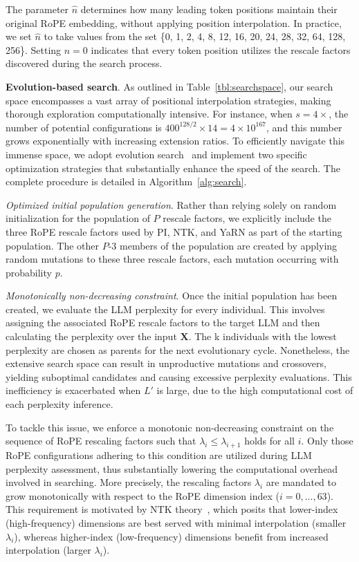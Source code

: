 The parameter $\hat{n}$ determines how many leading token positions maintain their original RoPE embedding, without applying position interpolation. In practice, we set $\hat{n}$ to take values from the set \{0, 1, 2, 4, 8, 12, 16, 20, 24, 28, 32, 64, 128, 256\}. Setting $\hat{n}=0$ indicates that every token position utilizes the rescale factors discovered during the search process.

\textbf{Evolution-based search}. As outlined in Table~\ref{tbl:searchspace}, our search space encompasses a vast array of positional interpolation strategies, making thorough exploration computationally intensive. For instance, when $s=4\times$, the number of potential configurations is $400^{128/2}\times14 = 4\times10^{167}$, and this number grows exponentially with increasing extension ratios. To efficiently navigate this immense space, we adopt evolution search~\cite{guo2020single} and implement two specific optimization strategies that substantially enhance the speed of the search. The complete procedure is detailed in Algorithm~\ref{alg:search}.

\textit{Optimized initial population generation}. Rather than relying solely on random initialization for the population of $P$ rescale factors, we explicitly include the three RoPE rescale factors used by PI, NTK, and YaRN as part of the starting population. The other $P$-3 members of the population are created by applying random mutations to these three rescale factors, each mutation occurring with probability $p$.

\textit{Monotonically non-decreasing constraint}. Once the initial population has been created, we evaluate the LLM perplexity for every individual. This involves assigning the associated RoPE rescale factors to the target LLM and then calculating the perplexity over the input $\mathbf{X}$. The k individuals with the lowest perplexity are chosen as parents for the next evolutionary cycle. Nonetheless, the extensive search space can result in unproductive mutations and crossovers, yielding suboptimal candidates and causing excessive perplexity evaluations. This inefficiency is exacerbated when $L'$ is large, due to the high computational cost of each perplexity inference.

To tackle this issue, we enforce a monotonic non-decreasing constraint on the sequence of RoPE rescaling factors such that $\lambda_i \le \lambda_{i+1}$ holds for all $i$. Only those RoPE configurations adhering to this condition are utilized during LLM perplexity assessment, thus substantially lowering the computational overhead involved in searching. More precisely, the rescaling factors $\lambda_i$ are mandated to grow monotonically with respect to the RoPE dimension index ($i=0,...,63$). This requirement is motivated by NTK theory~\cite{jacot2018neural,tancik2020fourier,ntk}, which posits that lower-index (high-frequency) dimensions are best served with minimal interpolation (smaller $\lambda_i$), whereas higher-index (low-frequency) dimensions benefit from increased interpolation (larger $\lambda_i$).

